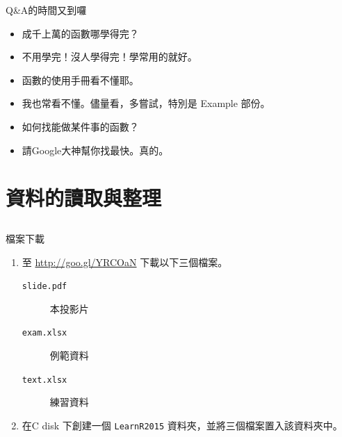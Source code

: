 \documentclass[12pt, aspectratio=43]{beamer}
\begin{document}
\begin{frame}[fragile]{Q\&A的時間又到囉}
\begin{itemize}
\item[Q] 成千上萬的函數哪學得完？
\item[A] 不用學完！沒人學得完！學常用的就好。
\end{itemize}
\begin{itemize}
\item[Q] 函數的使用手冊看不懂耶。
\item[A] 我也常看不懂。儘量看，多嘗試，特別是 Example 部份。
\end{itemize}
\begin{itemize}
\item[Q] 如何找能做某件事的函數？
\item[A] 請Google大神幫你找最快。真的。
\end{itemize}
\end{frame}


\section{資料的讀取與整理}\subsection{}


\begin{frame}[fragile]{檔案下載}
\begin{enumerate}
\item 至 \url{http://goo.gl/YRCOaN} 下載以下三個檔案。
\begin{description}
\item [\texttt{slide.pdf}]本投影片
\item [\texttt{exam.xlsx}]例範資料
\item [\texttt{text.xlsx}]練習資料
\end{description}

\item 在C disk 下創建一個 \verb+LearnR2015+ 資料夾，並將三個檔案置入該資料夾中。
\end{enumerate}
\end{frame}
\end{document}
